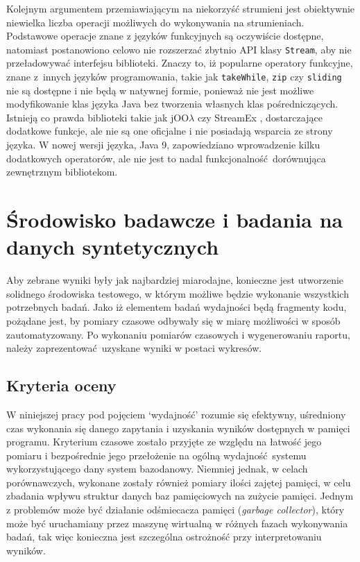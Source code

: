 \documentclass[12pt,twoside,openright]{extarticle}
\let\oldsection\section%
\renewcommand{\section}{\cleardoublepage\oldsection}%
\begin{document}
    Kolejnym argumentem przemiawiającym na niekorzyść strumieni jest obiektywnie niewielka liczba operacji możliwych do wykonywania na strumieniach. Podstawowe operacje znane z języków funkcyjnych są oczywiście dostępne, natomiast postanowiono celowo nie rozszerzać zbytnio API klasy \texttt{Stream}, aby nie przeładowywać interfejsu biblioteki. Znaczy to, iż popularne operatory funkcyjne, znane z~innych języków programowania, takie jak \texttt{takeWhile}, \texttt{zip} czy \texttt{sliding} nie są dostępne i nie będą w natywnej formie, ponieważ nie jest możliwe modyfikowanie klas języka Java bez tworzenia własnych klas pośredniczących. Istnieją co prawda biblioteki takie jak jOO$\lambda$ \cite{joolambda} czy StreamEx \cite{streamex}, dostarczające dodatkowe funkcje, ale nie są one oficjalne i nie posiadają wsparcia ze strony języka. W nowej wersji języka, Java 9, zapowiedziano wprowadzenie kilku dodatkowych operatorów, ale nie jest to nadal funkcjonalność dorównująca zewnętrznym bibliotekom.

\section{Środowisko badawcze i badania na danych syntetycznych}

    Aby zebrane wyniki były jak najbardziej miarodajne, konieczne jest utworzenie solidnego środowiska testowego, w którym możliwe będzie wykonanie wszystkich potrzebnych badań. Jako iż elementem badań wydajności będą fragmenty kodu, pożądane jest, by pomiary czasowe odbywały się w miarę możliwości w sposób zautomatyzowany. Po wykonaniu pomiarów czasowych i wygenerowaniu raportu, należy zaprezentować uzyskane wyniki w postaci wykresów.

\subsection{Kryteria oceny}

    W niniejszej pracy pod pojęciem `wydajność' rozumie się efektywny, uśredniony czas wykonania się danego zapytania i uzyskania wyników dostępnych w pamięci programu. Kryterium czasowe zostało przyjęte ze względu na łatwość jego pomiaru i bezpośrednie jego przełożenie na ogólną wydajność systemu wykorzystującego dany system bazodanowy. Niemniej jednak, w celach porównawczych, wykonane zostały również pomiary ilości zajętej pamięci, w celu zbadania wpływu struktur danych baz pamięciowych na zużycie pamięci. Jednym z problemów może być działanie odśmiecacza pamięci (\textit{garbage collector}), który może być uruchamiany przez maszynę wirtualną w różnych fazach wykonywania badań, tak więc konieczna jest szczególna ostrożność przy interpretowaniu wyników.
\end{document}
